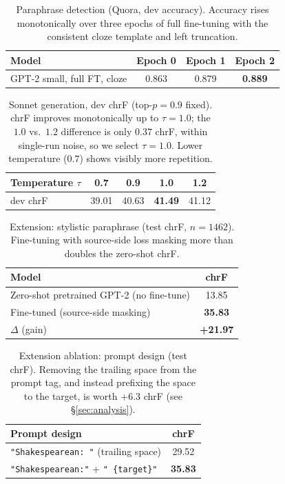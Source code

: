 \documentclass[10pt,twocolumn]{article}
\newcommand{\best}[1]{\textbf{#1}}
\begin{document}
\begin{table}[t]
\centering
\small
\begin{tabular}{@{}lccc@{}}
\toprule
\textbf{Model} & \textbf{Epoch 0} & \textbf{Epoch 1} & \textbf{Epoch 2} \\
\midrule
GPT-2 small, full FT, cloze & 0.863 & 0.879 & \best{0.889} \\
\bottomrule
\end{tabular}
\caption{Paraphrase detection (Quora, dev accuracy). Accuracy rises
monotonically over three epochs of full fine-tuning with the consistent cloze
template and left truncation.}
\label{tab:paraphrase}
\end{table}

\begin{table}[t]
\centering
\small
\begin{tabular}{@{}lcccc@{}}
\toprule
\textbf{Temperature $\tau$} & 0.7 & 0.9 & 1.0 & 1.2 \\
\midrule
dev chrF & 39.01 & 40.63 & \best{41.49} & 41.12 \\
\bottomrule
\end{tabular}
\caption{Sonnet generation, dev chrF (top-$p=0.9$ fixed). chrF improves
monotonically up to $\tau=1.0$; the $1.0$ vs.\ $1.2$ difference is only
$0.37$ chrF, within single-run noise, so we select $\tau=1.0$. Lower temperature
($0.7$) shows visibly more repetition.}
\label{tab:sonnet}
\end{table}

\begin{table}[t]
\centering
\small
\begin{tabular}{@{}lc@{}}
\toprule
\textbf{Model} & \textbf{chrF} \\
\midrule
Zero-shot pretrained GPT-2 (no fine-tune) & 13.85 \\
Fine-tuned (source-side masking) & \best{35.83} \\
\midrule
$\Delta$ (gain) & \best{+21.97} \\
\bottomrule
\end{tabular}
\caption{Extension: stylistic paraphrase (test chrF, $n=1462$). Fine-tuning with
source-side loss masking more than doubles the zero-shot chrF.}
\label{tab:extension}
\end{table}

\begin{table}[t]
\centering
\small
\begin{tabular}{@{}lc@{}}
\toprule
\textbf{Prompt design} & \textbf{chrF} \\
\midrule
\texttt{"Shakespearean: "} (trailing space) & 29.52 \\
\texttt{"Shakespearean:"} + \texttt{" \{target\}"} & \best{35.83} \\
\bottomrule
\end{tabular}
\caption{Extension ablation: prompt design (test chrF). Removing the trailing
space from the prompt tag, and instead prefixing the space to the target, is
worth $+6.3$ chrF (see \S\ref{sec:analysis}).}
\label{tab:promptablation}
\end{table}
\end{document}
